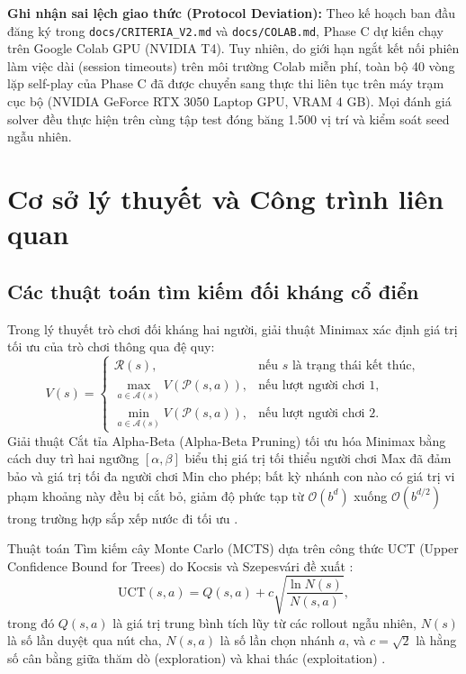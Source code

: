 \documentclass[11pt, a4paper]{article}
\begin{document}
\textbf{Ghi nhận sai lệch giao thức (Protocol Deviation):} Theo kế hoạch ban đầu đăng ký trong \texttt{docs/CRITERIA\_V2.md} và \texttt{docs/COLAB.md}, Phase C dự kiến chạy trên Google Colab GPU (NVIDIA T4). Tuy nhiên, do giới hạn ngắt kết nối phiên làm việc dài (session timeouts) trên môi trường Colab miễn phí, toàn bộ 40 vòng lặp self-play của Phase C đã được chuyển sang thực thi liên tục trên máy trạm cục bộ (NVIDIA GeForce RTX 3050 Laptop GPU, VRAM 4 GB). Mọi đánh giá solver đều thực hiện trên cùng tập test đóng băng 1.500 vị trí và kiểm soát seed ngẫu nhiên.

\section{Cơ sở lý thuyết và Công trình liên quan}

\subsection{Các thuật toán tìm kiếm đối kháng cổ điển}
Trong lý thuyết trò chơi đối kháng hai người, giải thuật Minimax xác định giá trị tối ưu của trò chơi thông qua đệ quy:
\begin{equation}
V(s) = \begin{cases}
\mathcal{R}(s), & \text{nếu } s \text{ là trạng thái kết thúc}, \\
\max_{a \in \mathcal{A}(s)} V(\mathcal{P}(s, a)), & \text{nếu lượt người chơi } 1, \\
\min_{a \in \mathcal{A}(s)} V(\mathcal{P}(s, a)), & \text{nếu lượt người chơi } 2.
\end{cases}
\end{equation}
Giải thuật Cắt tỉa Alpha-Beta (Alpha-Beta Pruning) tối ưu hóa Minimax bằng cách duy trì hai ngưỡng $[\alpha, \beta]$ biểu thị giá trị tối thiểu người chơi Max đã đảm bảo và giá trị tối đa người chơi Min cho phép; bất kỳ nhánh con nào có giá trị vi phạm khoảng này đều bị cắt bỏ, giảm độ phức tạp từ $\mathcal{O}(b^d)$ xuống $\mathcal{O}(b^{d/2})$ trong trường hợp sắp xếp nước đi tối ưu \cite{russell2021artificial}.

Thuật toán Tìm kiếm cây Monte Carlo (MCTS) dựa trên công thức UCT (Upper Confidence Bound for Trees) do Kocsis và Szepesv{\'a}ri đề xuất \cite{kocsis2006bandit}:
\begin{equation}
\text{UCT}(s, a) = Q(s, a) + c \sqrt{\frac{\ln N(s)}{N(s, a)}},
\end{equation}
trong đó $Q(s, a)$ là giá trị trung bình tích lũy từ các rollout ngẫu nhiên, $N(s)$ là số lần duyệt qua nút cha, $N(s, a)$ là số lần chọn nhánh $a$, và $c = \sqrt{2}$ là hằng số cân bằng giữa thăm dò (exploration) và khai thác (exploitation) \cite{browne2012survey}.
\end{document}
